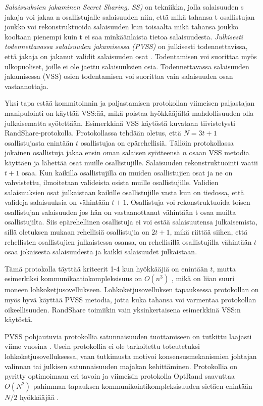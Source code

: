 \textit{Salaisuuksien jakaminen Secret Sharing, SS)} on tekniikka, jolla salaisuuden s jakaja voi jakaa n osallistujalle salaisuuden niin, että mikä tahansa t osallistujan joukko voi rekonstruktuoida salaisuuden kun toisaalta mikä tahansa joukko kooltaan pienempi kuin t ei saa minkäänlaista tietoa salaisuudesta\cite{shamir_how_1979}. \textit{Julkisesti todennettavassa salaisuuden jakamisessa (PVSS)} on julkisesti todennettavissa, että jakaja on jakanut validit salaisuuden osat \cite{StadlerMarkus2001PVSS}. Todentamisen voi suorittaa myös ulkopuoliset, joille ei ole jaettu salaisuuksien osia. Todennettavassa salaisuuden jakamisessa (VSS) osien todentamisen voi suorittaa vain salaisuuden osan vastaanottaja.

Yksi tapa estää kommitoinnin ja paljastamisen protokollan viimeisen paljastajan manipulointi on käyttää VSS:ää, mikä poistaa hyökkääjältä mahdollisuuden olla julkaisematta syötettään. Esimerkkinä VSS käytöstä kuvataan tiivistetysti RandShare-protokolla\cite{syta_scalable_2017}. Protokollassa tehdään oletus, että $N = 3t+1$ osallistujasta enintään $t$ osallistujaa on epärehellisiä. Tällöin protokollassa jokainen osallistuja jakaa ensin oman salaisen syötteensä $n$ osaan VSS metodia käyttäen ja lähettää osat muille osallistujille. Salaisuuden rekonstruktuointi vaatii $t+1$ osaa. Kun kaikilla osallistujilla on muiden osallistujien osat ja ne on vahvistettu, ilmoitetaan valideista osista muille osallistujille. Validien salaisuuksien osat julkaistaan kaikille osallistujille vasta kun on tiedossa, että valideja salaisuuksia on vähintään $t+1$. Osallistuja voi rekonstruktuoida toisen osallistujan salaisuuden jos hän on vastaanottanut vähintään t osaa muilta osallistujilta. Siis epärehellinen osallistuja ei voi estää salaisuutensa julkaisemista, sillä oletuksen mukaan rehellisiä osallistujia on $2t+1$, mikä riittää siihen, että rehellisten osallistujien julkaistessa osansa, on rehellisillä osallistujilla vähintään $t$ osaa jokaisesta salaisuudesta ja kaikki salaisuudet julkaistaan. 

Tämä protokolla täyttää kriteerit 1-4 kun hyökkääjiä on enintään $t$, mutta esimerkiksi kommunikaatiokompleksisuus on $O(n^3)$ \cite{syta_scalable_2017}, mikä on liian suuri moneen lohkoketjusovellukseen. Lohkoketjusovelluksen tapauksessa protokollan on myös hyvä käyttää PVSS metodia, jotta kuka tahansa voi varmentaa protokollan oikeellisuuden. RandShare toimiikin vain yksinkertaisena esimerkkinä VSS:n käytöstä. 

PVSS pohjautuvia protokollia satunnaisuuden tuottamiseen on tutkittu laajasti viime vuosina \cite{syta_scalable_2017, schindler_hydrand_2020, bhat2021randpiper, bhat2022optrand} . Usein protokollia ei ole tarkoitettu toteutetuksi lohkoketjusovelluksessa, vaan tutkimusta motivoi konsensusmekanismien johtajan valinnan tai julkisen satunnaisuuden majakan kehittäminen. Protokollia on pyritty optimoimaan eri tavoin ja viimeisin protokolla OptRand saavuttaa $O(N^2)$ pahimman tapauksen kommunikointikompleksisuuden  sietäen enintään $N/2$ hyökkääjää \cite{bhat2022optrand}.

